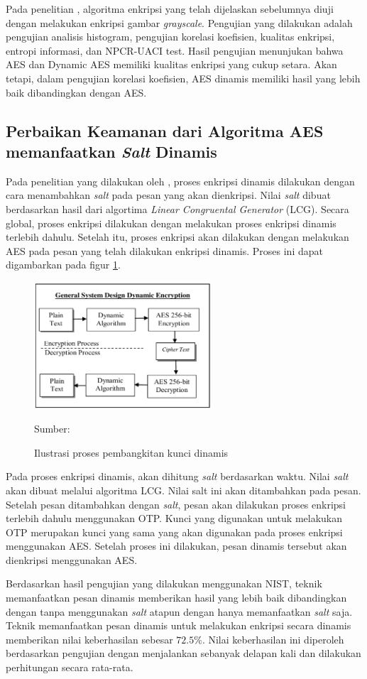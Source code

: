 Pada penelitian \textcite{singh2019}, algoritma enkripsi yang telah dijelaskan sebelumnya diuji dengan melakukan enkripsi gambar \emph{grayscale}. Pengujian yang dilakukan adalah pengujian analisis histogram, pengujian korelasi koefisien, kualitas enkripsi, entropi informasi, dan NPCR-UACI test. Hasil pengujian menunjukan bahwa AES dan Dynamic AES memiliki kualitas enkripsi yang cukup setara. Akan tetapi, dalam pengujian korelasi koefisien, AES dinamis memiliki hasil yang lebih baik dibandingkan dengan AES.

\subsection{Perbaikan Keamanan dari Algoritma AES memanfaatkan \emph{Salt} Dinamis}

Pada penelitian yang dilakukan oleh \textcite{bachtiar2018}, proses enkripsi dinamis dilakukan dengan cara menambahkan \emph{salt} pada pesan yang akan dienkripsi. Nilai \emph{salt} dibuat berdasarkan hasil dari algortima \emph{Linear Congruental Generator} (LCG). Secara global, proses enkripsi dilakukan dengan melakukan proses enkripsi dinamis terlebih dahulu. Setelah itu, proses enkripsi akan dilakukan dengan melakukan AES pada pesan yang telah dilakukan enkripsi dinamis. Proses ini dapat digambarkan pada figur \ref{fig:bachtiar.enc.process}.

\begin{figure}[!h]
  \centering
  \includegraphics[width=250px]{chapters/res/chapter-2/img/bachtiar.enc.process.png}
  \caption{Ilustrasi proses pembangkitan kunci dinamis} \label{fig:bachtiar.enc.process}
  Sumber: \textcite{bachtiar2018}
\end{figure}

Pada proses enkripsi dinamis, akan dihitung \emph{salt} berdasarkan waktu. Nilai \emph{salt} akan dibuat melalui algoritma LCG.  Nilai salt ini akan ditambahkan pada pesan. Setelah pesan ditambahkan dengan \emph{salt}, pesan akan dilakukan proses enkripsi terlebih dahulu menggunakan OTP. Kunci yang digunakan untuk melakukan OTP merupakan kunci yang sama yang akan digunakan pada proses enkripsi menggunakan AES. Setelah proses ini dilakukan, pesan dinamis tersebut akan dienkripsi menggunakan AES.

Berdasarkan hasil pengujian yang dilakukan menggunakan NIST, teknik memanfaatkan pesan dinamis memberikan hasil yang lebih baik dibandingkan dengan tanpa menggunakan \emph{salt} atapun dengan hanya memanfaatkan \emph{salt} saja. Teknik memanfaatkan pesan dinamis untuk melakukan enkripsi secara dinamis memberikan nilai keberhasilan sebesar $72.5\%$. Nilai keberhasilan ini diperoleh berdasarkan pengujian dengan menjalankan sebanyak delapan kali dan dilakukan perhitungan secara rata-rata.
